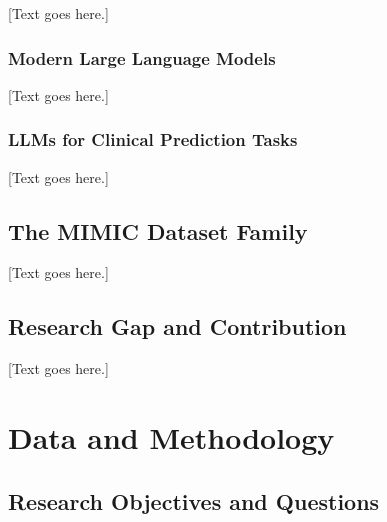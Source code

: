 \documentclass[12pt, a4paper]{article}
\begin{document}
[Text goes here.]

\subsubsection{Modern Large Language Models}

[Text goes here.]

\subsubsection{LLMs for Clinical Prediction Tasks}

[Text goes here.]

\subsection{The MIMIC Dataset Family}

[Text goes here.]

\subsection{Research Gap and Contribution}

[Text goes here.]

\section{Data and Methodology}

\subsection{Research Objectives and Questions}
%
%
\end{document}
